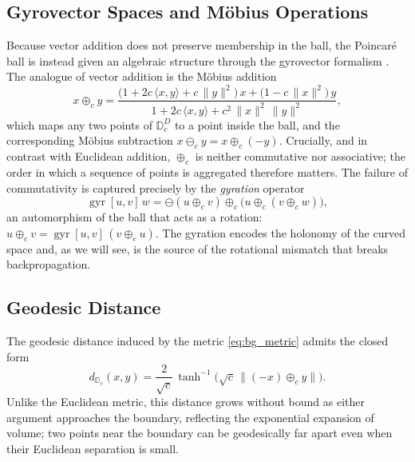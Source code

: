 \documentclass[12pt]{report}
\begin{document}
\subsection{Gyrovector Spaces and M\"obius Operations}
Because vector addition does not preserve membership in the ball, the Poincar\'e ball is instead given an algebraic structure through the gyrovector formalism \cite{ungar2009gyrovector}. The analogue of vector addition is the M\"obius addition
\begin{equation}
    \label{eq:bg_mobius_add}
    x \oplus_c y = \frac{\big(1 + 2c\,\langle x, y\rangle + c\,\|y\|^2\big)\,x + \big(1 - c\,\|x\|^2\big)\,y}{1 + 2c\,\langle x, y\rangle + c^2\,\|x\|^2\,\|y\|^2},
\end{equation}
which maps any two points of $\mathbb{D}_c^D$ to a point inside the ball, and the corresponding M\"obius subtraction $x \ominus_c y = x \oplus_c (-y)$. Crucially, and in contrast with Euclidean addition, $\oplus_c$ is neither commutative nor associative; the order in which a sequence of points is aggregated therefore matters. The failure of commutativity is captured precisely by the \emph{gyration} operator
\begin{equation}
    \label{eq:bg_gyration}
    \operatorname{gyr}[u, v]\,w = \ominus(u \oplus_c v) \oplus_c \big(u \oplus_c (v \oplus_c w)\big),
\end{equation}
an automorphism of the ball that acts as a rotation: $u \oplus_c v = \operatorname{gyr}[u, v]\,(v \oplus_c u)$. The gyration encodes the holonomy of the curved space and, as we will see, is the source of the rotational mismatch that breaks backpropagation.

\subsection{Geodesic Distance}
The geodesic distance induced by the metric \ref{eq:bg_metric} admits the closed form
\begin{equation}
    \label{eq:bg_distance}
    d_{\mathbb{D}_c}(x, y) = \frac{2}{\sqrt{c}}\,\tanh^{-1}\!\Big(\sqrt{c}\,\big\|(-x) \oplus_c y\big\|\Big).
\end{equation}
Unlike the Euclidean metric, this distance grows without bound as either argument approaches the boundary, reflecting the exponential expansion of volume; two points near the boundary can be geodesically far apart even when their Euclidean separation is small.
\end{document}
